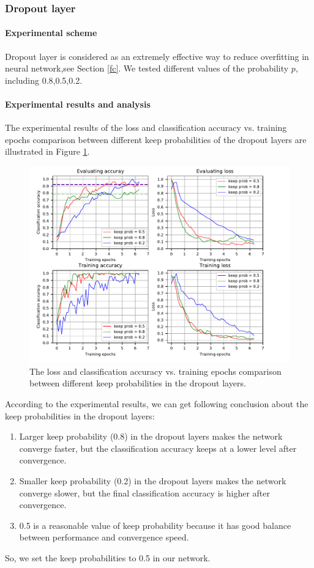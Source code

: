 \subsubsection{Dropout layer}
\paragraph{Experimental scheme}
Dropout layer is considered as an extremely effective way to reduce overfitting in neural network,see Section \ref{fc}. We tested different values of the probability \(p\), including 0.8,0.5,0.2.

\paragraph{Experimental results and analysis}
The experimental results of the loss and classification accuracy vs. training epochs comparison between different keep probabilities of the dropout layers are illustrated in Figure \ref{fig:plot_dropout}.
\begin{figure}
	\includegraphics[trim=0cm 0cm 0cm 0cm]{fig01/plot_dropout.pdf}
	\caption{The loss and classification accuracy vs. training epochs comparison between different keep probabilities in the dropout layers.}
	\label{fig:plot_dropout}
\end{figure}

According to the experimental results, we can get following conclusion about the keep probabilities in the dropout layers:
\begin{enumerate}
	\item Larger keep probability (0.8) in the dropout layers makes the network converge faster, but the classification accuracy keeps at a lower level after convergence.
	\item Smaller keep probability (0.2) in the dropout layers makes the network converge slower, but the final classification accuracy is higher after convergence.
	\item 0.5 is a reasonable value of keep probability because it has good balance between performance and convergence speed.
\end{enumerate}
So, we set the keep probabilities to 0.5 in our network. 

